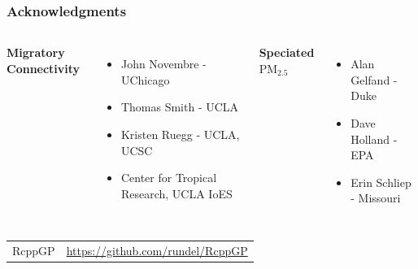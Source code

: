 \documentclass[t]{beamer}\usepackage[]{graphicx}\usepackage[]{color}
\newcommand{\PM}{$\text{PM}_{2.5}$ }
\begin{document}
\begin{frame}
\frametitle{Acknowledgments}

\begin{columns}[t]
\textbf{Migratory Connectivity}
\vspace{5mm}
\begin{itemize}
  \item John Novembre - UChicago
  \item Thomas Smith - UCLA
  \item Kristen Ruegg - UCLA, UCSC
  \item Center for Tropical Research, UCLA IoES
\end{itemize}

\textbf{Speciated \PM}
\vspace{2.5mm}
\begin{itemize}
  \item Alan Gelfand - Duke
  \item Dave Holland - EPA
  \item Erin Schliep - Missouri
\end{itemize}
\end{columns}

\vfill

\begin{center}
\begin{tabular}{ll}
RcppGP & \url{https://github.com/rundel/RcppGP} \\ 
\end{tabular}
\end{center}

\end{frame}
\end{document}
